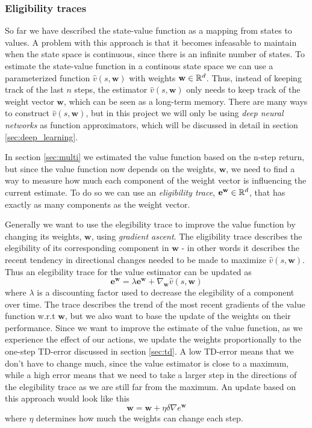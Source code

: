\documentclass[11pt]{article}
\begin{document}
\subsubsection{Eligibility traces}\label{sec:et}

So far we have described the state-value function as a mapping from states to values.
A problem with this approach is that it becomes infeasable to maintain 
when the state space is continuous, since there is an infinite number of states.
To estimate the state-value function in a continous state space we can use a
parameterized function $\hat{v}(s, \mathbf{w})$ with weights $\mathbf{w} \in \mathbb{R}^d$.
Thus, instead of keeping track of the last $n$ steps, the estimator $\hat{v}(s, \mathbf{w})$
only needs to keep track of the weight vector $\mathbf{w}$, which can be seen as a long-term memory.
There are many ways to construct $\hat{v}(s, \mathbf{w})$, but in this project we will only
be using \textit{deep neural networks} as function approximators,
which will be discussed in detail in section \ref{sec:deep_learning}.

In section \ref{sec:multi} we estimated the value function based on the n-step return, but
since the value function now depends on the weights, $\mathbf{w}$, we need to find a way
to measure how much each component of the weight vector is influencing the
current estimate.
To do so we can use an \textit{eligibility trace}, $\mathbf{e}^{\mathbf{w}} \in \mathbb{R}^d$, that
has exactly as many components as the weight vector.

Generally we want to use the elegibility trace to improve the value function by
changing its weights, $\mathbf{w}$, using \textit{gradient ascent}.
The eligibility trace describes the elegibility of its corresponding component in $\mathbf{w}$
- in other words it describes the recent tendency in directional changes needed to be made
to maximize $\hat{v}(s, \mathbf{w})$.
Thus an elegibility trace for the value estimator can be updated as
\begin{equation}
    \mathbf{e}^\mathbf{w} = \lambda \mathbf{e}^\mathbf{w} + \nabla_\mathbf{w} \hat{v}(s, \mathbf{w})
\end{equation}
where $\lambda$ is a discounting factor used to decrease the elegibility of a component
over time.
The trace describes the trend of the most recent gradients of the value function
w.r.t $\mathbf{w}$, but we also want to base the update of the weights on their
performance.
Since we want to improve the estimate of the value function, as we experience the effect of our actions,
we update the weights proportionally to the one-step TD-error discussed in section \ref{sec:td}.
A low TD-error means that we don't have to change much, since the value estimator is
close to a maximum, while a high error means that we need to take a larger step
in the directions of the elegibility trace as we are still far from the maximum.
An update based on this approach would look like this
\begin{equation}
    \mathbf{w} = \mathbf{w} + \eta \delta \nabla e^\mathbf{w}
\end{equation}
where $\eta$ determines how much the weights can change each step.
\end{document}
